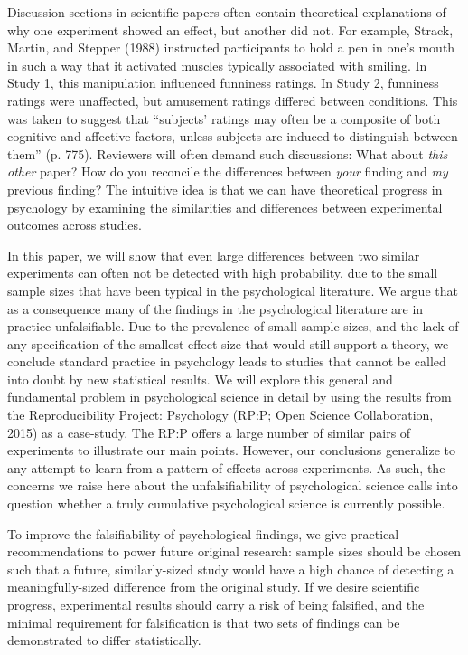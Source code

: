 \documentclass[doc,a4paper,floatsintext,draftfirst]{apa6}
\begin{document}
Discussion sections in scientific papers often contain theoretical explanations of why one experiment showed an effect, but another did not. For example, Strack, Martin, and Stepper (1988) instructed participants to hold a pen in one's mouth in such a way that it activated muscles typically associated with smiling. In Study 1, this manipulation influenced funniness ratings. In Study 2, funniness ratings were unaffected, but amusement ratings differed between conditions. This was taken to suggest that ``subjects' ratings may often be a composite of both cognitive and affective factors, unless subjects are induced to distinguish between them'' (p. 775). Reviewers will often demand such discussions: What about {\em this other} paper? How do you reconcile the differences between {\em your} finding and {\em my} previous finding? The intuitive idea is that we can have  theoretical progress in psychology by examining the similarities and differences between experimental outcomes across studies. 

\nocite{Strack:etal:1988}

In this paper, we will show that even large differences between two similar experiments can often not be detected with high probability, due to the small sample sizes that have been typical in the psychological literature. We argue that as a consequence many of the findings in the psychological literature are in practice unfalsifiable. Due to the prevalence of small sample sizes, and the lack of any specification of the smallest effect size that would still support a theory, we conclude standard practice in psychology leads to studies that cannot be called into doubt by new statistical results. We will explore this general and fundamental problem in psychological science in detail by using the results from the Reproducibility Project: Psychology (RP:P; Open Science Collaboration, 2015) as a case-study. The RP:P offers a large number of similar pairs of experiments to illustrate our main points. However, our conclusions generalize to any attempt to learn from a pattern of effects across experiments. As such, the concerns we raise here about the unfalsifiability of psychological science calls into question whether a truly cumulative psychological science is currently possible. 

\nocite{OpenScienceCollaboration:2015}

To improve the falsifiability of psychological findings, we give practical recommendations to power future original research: sample sizes should be chosen such that a future, similarly-sized study would have a high chance of detecting a meaningfully-sized difference from the original study. If we desire scientific progress, experimental results should carry a risk of being falsified, and the minimal requirement for falsification is that two sets of findings can be demonstrated to differ statistically. 
\end{document}
